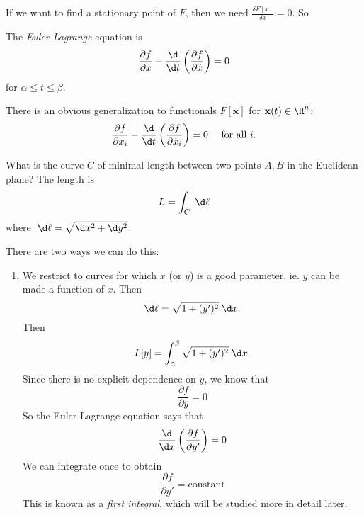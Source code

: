 \documentclass[a4paper]{article}
\begin{document}
If we want to find a stationary point of $F$, then we need $\frac{\delta F[x]}{\delta x} = 0$. So
\begin{defi}
  The \emph{Euler-Lagrange} equation is
  \[
    \frac{\partial f}{\partial x} - \frac{\d}{\d t}\left(\frac{\partial f}{\partial  \dot{x}}\right) = 0
  \]
  for $\alpha \leq t \leq \beta$.
\end{defi}
There is an obvious generalization to functionals $F[\mathbf{x}]$  for $\mathbf{x}(t) \in \R^n$:
\[
  \frac{\partial f}{\partial x_i} - \frac{\d }{\d t}\left(\frac{\partial f}{\partial \dot{x}_i}\right) = 0 \quad\text{ for all }i.
\]
\begin{eg}
  What is the curve $C$ of minimal length between two points $A, B$ in the Euclidean plane? The length is
  \[
    L = \int_C \;\d \ell
  \]
  where $\;\d \ell = \sqrt{\d x^2 + \d y^2}$.

  There are two ways we can do this:
  \begin{enumerate}
    \item We restrict to curves for which $x$ (or $y$) is a good parameter, ie. $y$ can be made a function of $x$. Then
      \[
        \d \ell = \sqrt{1 + (y')^2}\;\d x.
      \]
      Then
      \[
        L[y] = \int_\alpha^\beta \sqrt{1 + (y')^2}\;\d x.
      \]
      Since there is no explicit dependence on $y$, we know that
      \[
        \frac{\partial f}{\partial y} = 0
      \]
      So the Euler-Lagrange equation says that
      \[
        \frac{\d}{\d x} \left(\frac{\partial f}{\partial y'}\right) = 0
      \]
      We can integrate once to obtain
      \[
        \frac{\partial f}{\partial y'} = \text{constant}
      \]
      This is known as a \emph{first integral}, which will be studied more in detail later.


\end{enumerate}
\end{eg}
\end{document}
